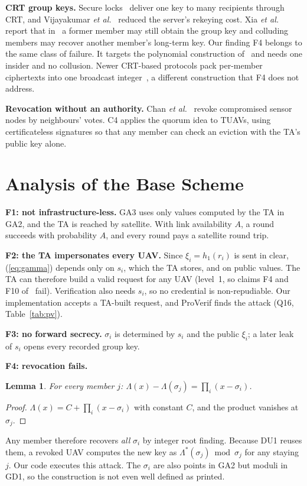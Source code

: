 \documentclass[conference]{IEEEtran}
\newtheorem{lemma}{Lemma}
\begin{document}
\textbf{CRT group keys.} Secure locks~\cite{securelock} deliver one key to many recipients through CRT, and Vijayakumar \textit{et al.}~\cite{vijay14} reduced the
server's rekeying cost. Xia \textit{et al.}~\cite{xia23} report that in~\cite{vijay14} a former member may still obtain the group key and colluding members may recover
another member's long-term key. Our finding F4 belongs to the same class of failure. It targets the polynomial construction of~\cite{base} and needs one insider and no
collusion. Newer CRT-based protocols pack per-member ciphertexts into one broadcast integer~\cite{pug}, a different construction that F4 does not address.

\textbf{Revocation without an authority.} Chan \textit{et al.}~\cite{chan05} revoke compromised sensor nodes by neighbours' votes. C4 applies the quorum idea to TUAVs,
using certificateless signatures so that any member can check an eviction with the TA's public key alone.

\section{Analysis of the Base Scheme}\label{sec:findings}
\textbf{F1: not infrastructure-less.} GA3 uses only values computed by the TA in GA2, and the TA is reached by satellite. With link availability $A$, a round
succeeds with probability $A$, and every round pays a satellite round trip.

\textbf{F2: the TA impersonates every UAV.} Since $\xi_i=h_1(r_i)$ is sent in clear, (\ref{eq:gamma}) depends only on $s_i$, which the TA stores, and on public
values. The TA can therefore build a valid request for any UAV (level~1, so claims F4 and F10 of~\cite{base} fail). Verification also needs $s_i$, so no
credential is non-repudiable. Our implementation accepts a TA-built request, and ProVerif finds the attack (Q16, Table~\ref{tab:pv}).

\textbf{F3: no forward secrecy.} $\sigma_i$ is determined by $s_i$ and the public $\xi_i$; a later leak of $s_i$ opens every recorded group key.

\textbf{F4: revocation fails.}
\begin{lemma}\label{lem:leak}
For every member $j$: $\Lambda(x)-\Lambda(\sigma_j)=\prod_i(x-\sigma_i)$.
\end{lemma}
\begin{proof}
$\Lambda(x)=C+\prod_i(x-\sigma_i)$ with constant $C$, and the product vanishes at $\sigma_j$.
\end{proof}
Any member therefore recovers \emph{all} $\sigma_i$ by integer root finding. Because DU1 reuses them, a revoked UAV computes the new key as
$\Lambda^*(\sigma_j)\bmod\sigma_j$ for any staying $j$. Our code executes this attack. The $\sigma_i$ are also points in GA2 but moduli in GD1, so the
construction is not even well defined as printed.
\end{document}
